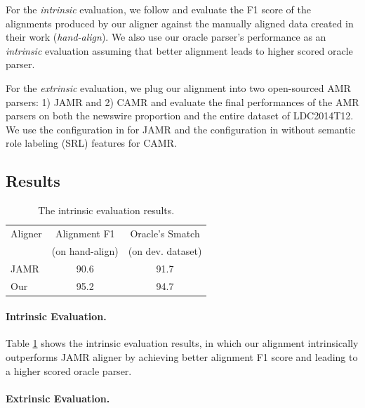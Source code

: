 \documentclass[11pt,a4paper]{article}
\begin{document}
For the {\it intrinsic} evaluation, we follow \citet{flanigan-EtAl:2014:P14-1}
and evaluate the F1 score of the alignments produced by our aligner
against the manually aligned data created in their work
({\it hand-align}).
We also use our oracle parser's performance as an {\it intrinsic} evaluation
assuming that better alignment leads to higher scored oracle parser.

For the {\it extrinsic} evaluation, we plug our alignment into two open-sourced AMR parsers: 1) JAMR \citep{flanigan-EtAl:2014:P14-1,flanigan-EtAl:2016:SemEval}
and 2) CAMR \cite{wang-xue-pradhan:2015:NAACL-HLT,wang-xue-pradhan:2015:ACL-IJCNLP} and evaluate the final performances of the AMR parsers
on both the newswire proportion and the entire dataset of LDC2014T12.
We use the configuration in \citet{flanigan-EtAl:2016:SemEval} for JAMR 
and the configuration in \citet{wang-xue-pradhan:2015:ACL-IJCNLP} without 
semantic role labeling (SRL) features for CAMR.

\subsection{Results}

\begin{table}[t]
	\centering
	\begin{tabular}{lcc}
		\hline
		Aligner & Alignment F1 & Oracle's Smatch\\
		& (on hand-align) & (on dev. dataset)\\
		\hline
		JAMR & 90.6 & 91.7 \\
		Our & 95.2 & 94.7 \\
		\hline
	\end{tabular}
	\caption{The intrinsic evaluation results.}\label{tbl:int-eval}
\end{table}

\paragraph{Intrinsic Evaluation.}
Table \ref{tbl:int-eval} shows the intrinsic evaluation
results, in which our alignment
intrinsically outperforms JAMR aligner by
achieving better alignment F1 score and leading
to a higher scored oracle parser.

\paragraph{Extrinsic Evaluation.}
\end{document}
